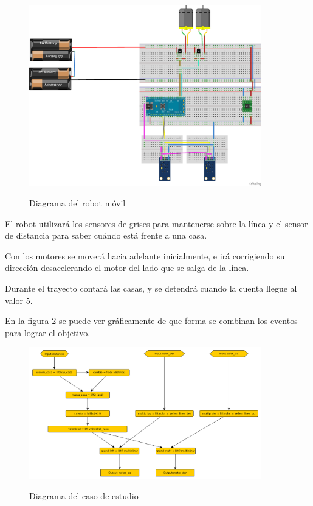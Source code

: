 \begin{figure}[hbtp]
\begin{center}
\caption{Diagrama del robot móvil}
\includegraphics[width=0.9\textwidth]{graphs/breaboardbb.png}
\label{fig:deliverybot}
\end{center}
\end{figure}
 

  El robot utilizará los sensores de grises para mantenerse sobre
la línea y el sensor de distancia para saber cuándo está frente
a una casa.

  Con los motores se moverá hacia adelante inicialmente, e irá corrigiendo
  su dirección desacelerando el motor del lado que se salga de la línea.

  Durante el trayecto contará las casas, y se detendrá cuando la cuenta
llegue al valor 5.

  En la figura \ref{fig:delivery} se puede ver gráficamente de que forma
se combinan los eventos para lograr el objetivo.

\begin{figure}[hbtp]
\begin{center}
\caption{Diagrama del caso de estudio}
\includegraphics[width=0.9\textwidth]{graphs/delivery.png}
\label{fig:delivery}
\end{center}
\end{figure}

